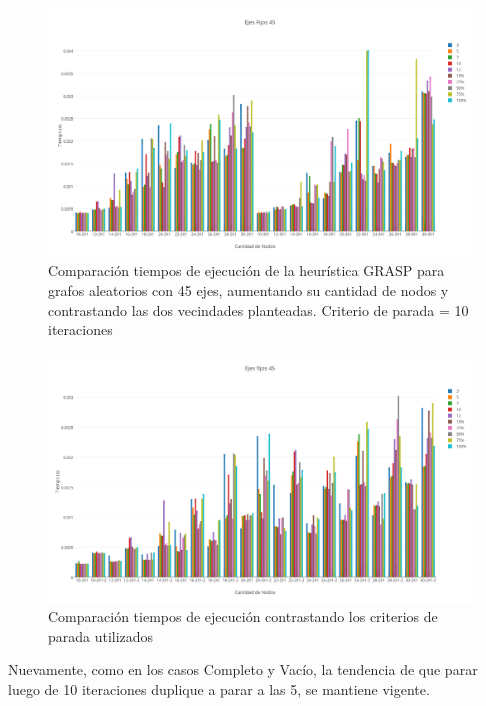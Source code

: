   \begin{figure}[h!]
   \begin{center}
 	\includegraphics[scale=0.35]{imagenes/grasp/45ejes-10repes.png}
 	\caption{Comparaci\'on tiempos de ejecuci\'on de la heur\'istica GRASP para grafos aleatorios con 45 ejes, aumentando su cantidad de nodos y contrastando las dos vecindades planteadas. Criterio de parada = 10 iteraciones}
   \end{center}
 \end{figure}

  \begin{figure}[h!]
   \begin{center}
 	\includegraphics[scale=0.35]{imagenes/grasp/45ejes-5vs10.png}
 	\caption{Comparaci\'on tiempos de ejecuci\'on contrastando los criterios de parada utilizados}
   \end{center}
 \end{figure}
\newpage

Nuevamente, como en los casos Completo y Vac\'io, la tendencia de que parar luego de 10 iteraciones duplique a parar a las 5, se mantiene vigente.

